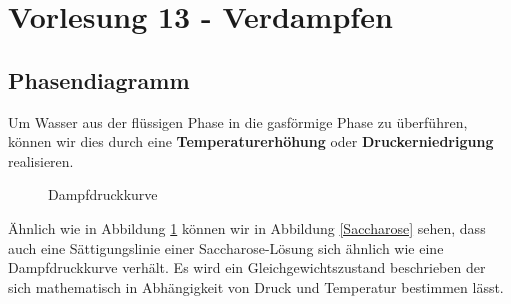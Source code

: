 \documentclass[a4paper,10pt,twoside]{article}
\begin{document}
\newpage
\section*{Vorlesung 13 - Verdampfen}
\addtocounter{section}{1}
\subsection{Phasendiagramm}
Um Wasser aus der flüssigen Phase in die gasförmige Phase zu überführen, können wir dies durch eine \textbf{Temperaturerhöhung} oder \textbf{Druckerniedrigung} realisieren.

\begin{figure}[h]
\centering
{}
\caption{Dampfdruckkurve}
\label{Dampfdruckkurve}
\end{figure}

Ähnlich wie in Abbildung \ref{Dampfdruckkurve} können wir in Abbildung \ref{Saccharose} sehen, dass auch eine Sättigungslinie einer Saccharose-Lösung sich ähnlich wie eine Dampfdruckkurve verhält. Es wird ein Gleichgewichtszustand beschrieben der sich mathematisch in Abhängigkeit von Druck und Temperatur bestimmen lässt.
\end{document}
